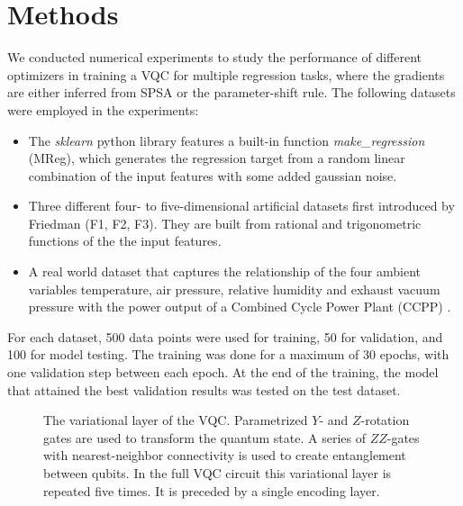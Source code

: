 \section{Methods}
\label{sec:Methods}

We conducted numerical experiments to study the performance of different optimizers in training a VQC for multiple regression tasks, where the gradients are either inferred from SPSA or the parameter-shift rule. The following datasets were employed in the experiments:
\begin{itemize}
    \item The \textit{sklearn} python library features a built-in function \textit{make\_regression} (MReg), which generates the regression target from a random linear combination of the input features with some added gaussian noise.
    \item Three different four- to five-dimensional artificial datasets first introduced by Friedman \cite{friedman1991multivariate, breiman1996bagging} (F1, F2, F3). They are built from rational and trigonometric functions of the the input features.
    \item A real world dataset that captures the relationship of the four ambient variables temperature, air pressure, relative humidity and exhaust vacuum pressure with the power output of a Combined Cycle Power Plant (CCPP) \cite{Tufekci2014}.
\end{itemize}
For each dataset, 500 data points were used for training, 50 for validation, and 100 for model testing. The training was done for a maximum of 30 epochs, with one validation step between each epoch. At the end of the training, the model that attained the best validation results was tested on the test dataset.

\begin{figure}
    \centering
    \caption{The variational layer of the VQC. Parametrized \(Y\)- and \(Z\)-rotation gates are used to transform the quantum state. A series of \(ZZ\)-gates with nearest-neighbor connectivity is used to create entanglement between qubits. In the full VQC circuit this variational layer is repeated five times. It is preceded by a single encoding layer.}
    \label{fig:VariationalLayer}
\end{figure}

